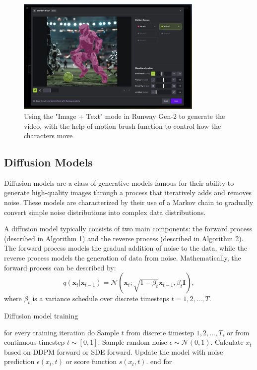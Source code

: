 \documentclass[11pt,a4paper,oneside]{report}
\begin{document}
\begin{figure}[htbp]
  \centering
  \includegraphics[width=0.8\textwidth]{Runway.png}
  \caption{Using the "Image + Text" mode in Runway Gen-2 to generate the video, with the help of motion brush function to control how the characters move}
\end{figure}

\subsection{Diffusion Models}

Diffusion models \cite{sohl2015deep, ho2020denoising} are a class of generative models famous for their ability to generate high-quality images through a process that iteratively adds and removes noise. These models are characterized by their use of a Markov chain to gradually convert simple noise distributions into complex data distributions.

A diffusion model typically consists of two main components: the forward process (described in Algorithm 1) and the reverse process (described in Algorithm 2). The forward process models the gradual addition of noise to the data, while the reverse process models the generation of data from noise. Mathematically, the forward process can be described by:
\begin{equation}
q(\mathbf{x}_t | \mathbf{x}_{t-1}) = \mathcal{N}(\mathbf{x}_t; \sqrt{1-\beta_t} \mathbf{x}_{t-1}, \beta_t \mathbf{I}),
\end{equation}
where $\beta_t$ is a variance schedule over discrete timesteps $t = 1, 2, ..., T$. 

\begin{algorithm}
\caption{Diffusion model training \cite{bie2023renaissance}}
\begin{algorithmic}[1]
\STATE for every training iteration do
\STATE \hspace{\algorithmicindent} Sample $t$ from discrete timestep $1, 2, \ldots, T$, or from continuous timestep $t \sim [0, 1]$.
\STATE \hspace{\algorithmicindent} Sample random noise $\epsilon \sim \mathcal{N}(0, 1)$.
\STATE \hspace{\algorithmicindent} Calculate $x_t$ based on DDPM forward or SDE forward.
\STATE \hspace{\algorithmicindent} Update the model with noise prediction $\epsilon(x_t, t)$ or score function $s(x_t, t)$.
\STATE end for
\end{algorithmic}
\label{alg:diffusion_model_training}
\end{algorithm}
\end{document}
